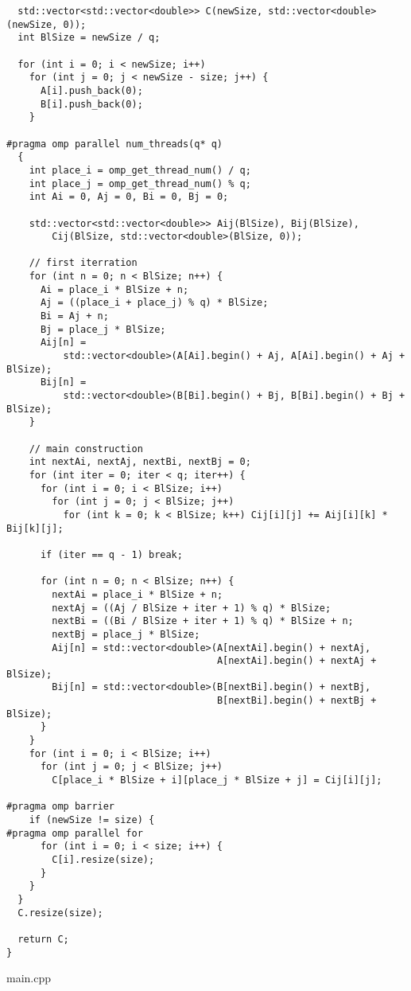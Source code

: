 \documentclass{report}
\begin{document}
\begin{lstlisting}
  std::vector<std::vector<double>> C(newSize, std::vector<double>(newSize, 0));
  int BlSize = newSize / q;

  for (int i = 0; i < newSize; i++)
    for (int j = 0; j < newSize - size; j++) {
      A[i].push_back(0);
      B[i].push_back(0);
    }

#pragma omp parallel num_threads(q* q)
  {
    int place_i = omp_get_thread_num() / q;
    int place_j = omp_get_thread_num() % q;
    int Ai = 0, Aj = 0, Bi = 0, Bj = 0;

    std::vector<std::vector<double>> Aij(BlSize), Bij(BlSize),
        Cij(BlSize, std::vector<double>(BlSize, 0));

    // first iterration
    for (int n = 0; n < BlSize; n++) {
      Ai = place_i * BlSize + n;
      Aj = ((place_i + place_j) % q) * BlSize;
      Bi = Aj + n;
      Bj = place_j * BlSize;
      Aij[n] =
          std::vector<double>(A[Ai].begin() + Aj, A[Ai].begin() + Aj + BlSize);
      Bij[n] =
          std::vector<double>(B[Bi].begin() + Bj, B[Bi].begin() + Bj + BlSize);
    }

    // main construction
    int nextAi, nextAj, nextBi, nextBj = 0;
    for (int iter = 0; iter < q; iter++) {
      for (int i = 0; i < BlSize; i++)
        for (int j = 0; j < BlSize; j++)
          for (int k = 0; k < BlSize; k++) Cij[i][j] += Aij[i][k] * Bij[k][j];

      if (iter == q - 1) break;

      for (int n = 0; n < BlSize; n++) {
        nextAi = place_i * BlSize + n;
        nextAj = ((Aj / BlSize + iter + 1) % q) * BlSize;
        nextBi = ((Bi / BlSize + iter + 1) % q) * BlSize + n;
        nextBj = place_j * BlSize;
        Aij[n] = std::vector<double>(A[nextAi].begin() + nextAj,
                                     A[nextAi].begin() + nextAj + BlSize);
        Bij[n] = std::vector<double>(B[nextBi].begin() + nextBj,
                                     B[nextBi].begin() + nextBj + BlSize);
      }
    }
    for (int i = 0; i < BlSize; i++)
      for (int j = 0; j < BlSize; j++)
        C[place_i * BlSize + i][place_j * BlSize + j] = Cij[i][j];

#pragma omp barrier
    if (newSize != size) {
#pragma omp parallel for
      for (int i = 0; i < size; i++) {
        C[i].resize(size);
      }
    }
  }
  C.resize(size);

  return C;
}
\end{lstlisting}
main.cpp
\end{document}
